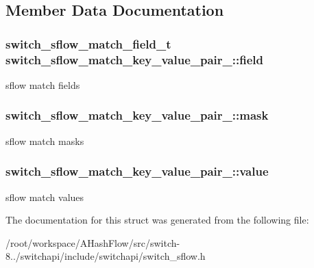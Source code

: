 \subsection{Member Data Documentation}
\hypertarget{structswitch__sflow__match__key__value__pair___abbbf6be6bc8444f221ebfc0b3254121f}{
\subsubsection[{field}]{\setlength{\rightskip}{0pt plus 5cm}switch\+\_\+sflow\+\_\+match\+\_\+field\+\_\+t switch\+\_\+sflow\+\_\+match\+\_\+key\+\_\+value\+\_\+pair\+\_\+\+::field}}\label{structswitch__sflow__match__key__value__pair___abbbf6be6bc8444f221ebfc0b3254121f}
sflow match fields \hypertarget{structswitch__sflow__match__key__value__pair___a830d6fe4f07c3e925c867f1573a688d2}{
\subsubsection[{mask}]{ switch\+\_\+sflow\+\_\+match\+\_\+key\+\_\+value\+\_\+pair\+\_\+\+::mask}}\label{structswitch__sflow__match__key__value__pair___a830d6fe4f07c3e925c867f1573a688d2}
sflow match masks \hypertarget{structswitch__sflow__match__key__value__pair___a56e342926a968adae8e382b516d40142}{
\subsubsection[{value}]{ switch\+\_\+sflow\+\_\+match\+\_\+key\+\_\+value\+\_\+pair\+\_\+\+::value}}\label{structswitch__sflow__match__key__value__pair___a56e342926a968adae8e382b516d40142}
sflow match values 

The documentation for this struct was generated from the following file\+:\begin{DoxyCompactItemize}
\item 
/root/workspace/\+A\+Hash\+Flow/src/switch-\/8../switchapi/include/switchapi/switch\+\_\+sflow.\+h\end{DoxyCompactItemize}
